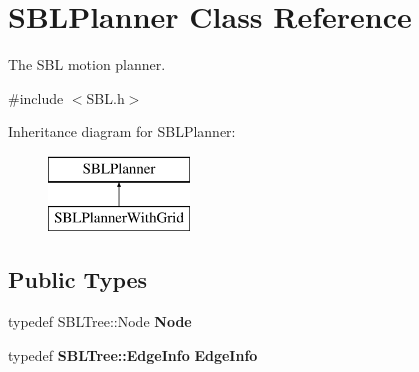 \section{S\+B\+L\+Planner Class Reference}
\label{classSBLPlanner}


The S\+BL motion planner.  




{\ttfamily \#include $<$S\+B\+L.\+h$>$}

Inheritance diagram for S\+B\+L\+Planner\+:\begin{figure}[H]
\begin{center}
\leavevmode
\includegraphics[height=2.000000cm]{classSBLPlanner}
\end{center}
\end{figure}
\subsection*{Public Types}
\begin{DoxyCompactItemize}
\item 
typedef S\+B\+L\+Tree\+::\+Node {\bfseries Node}\label{classSBLPlanner_a169f36f0433ca8891996f18efd99c2c5}

\item 
typedef {\bf S\+B\+L\+Tree\+::\+Edge\+Info} {\bfseries Edge\+Info}\label{classSBLPlanner_a017acd60bfdb134c65c3892a9b3de842}

\end{DoxyCompactItemize}
